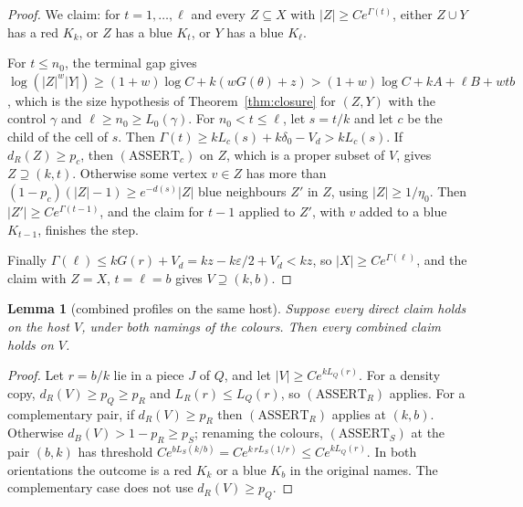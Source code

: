 \documentclass[11pt]{article}
\newtheorem{lemma}[theorem]{Lemma}
\theoremstyle{definition}
\theoremstyle{remark}
\begin{document}
\begin{proof}
We claim: for $t=1,\dots,\ell$ and every $Z\subseteq X$ with $|Z|\ge Ce^{\Gamma(t)}$, either $Z\cup Y$ has a red
$K_k$, or $Z$ has a blue $K_t$, or $Y$ has a blue $K_\ell$.

For $t\le n_0$, the terminal gap gives
$\log(|Z|^w|Y|)\ge(1+w)\log C+k(wG(\theta)+z)>(1+w)\log C+kA+\ell B+wtb$, which is the size hypothesis of
Theorem~\ref{thm:closure} for $(Z,Y)$ with the control $\gamma$ and $\ell\ge n_0\ge L_0(\gamma)$. For $n_0<t\le\ell$, let
$s=t/k$ and let $c$ be the child of the cell of $s$. Then $\Gamma(t)\ge kL_c(s)+k\delta_0-V_d>kL_c(s)$. If
$d_R(Z)\ge p_c$, then $(\mathrm{ASSERT}_c)$ on $Z$, which is a proper subset of $V$, gives $Z\supseteq(k,t)$. Otherwise
some vertex $v\in Z$ has more than $(1-p_c)(|Z|-1)\ge e^{-d(s)}|Z|$ blue neighbours $Z'$ in $Z$, using $|Z|\ge1/\eta_0$.
Then $|Z'|\ge Ce^{\Gamma(t-1)}$, and the claim for $t-1$ applied to $Z'$, with $v$ added to a blue $K_{t-1}$, finishes
the step.

Finally $\Gamma(\ell)\le kG(r)+V_d=kz-k\varepsilon/2+V_d<kz$, so $|X|\ge Ce^{\Gamma(\ell)}$, and the claim with $Z=X$,
$t=\ell=b$ gives $V\supseteq(k,b)$.
\end{proof}

\begin{lemma}[combined profiles on the same host]\label{lem:closed}
Suppose every direct claim holds on the host $V$, under both namings of the colours. Then every combined claim holds on $V$.
\end{lemma}

\begin{proof}
Let $r=b/k$ lie in a piece $J$ of $Q$, and let $|V|\ge Ce^{kL_Q(r)}$. For a density copy, $d_R(V)\ge p_Q\ge p_R$ and
$L_R(r)\le L_Q(r)$, so $(\mathrm{ASSERT}_R)$ applies. For a complementary pair, if $d_R(V)\ge p_R$ then
$(\mathrm{ASSERT}_R)$ applies at $(k,b)$. Otherwise $d_B(V)>1-p_R\ge p_S$; renaming the colours, $(\mathrm{ASSERT}_S)$ at
the pair $(b,k)$ has threshold $Ce^{bL_S(k/b)}=Ce^{k\,rL_S(1/r)}\le Ce^{kL_Q(r)}$. In both orientations the outcome is a
red $K_k$ or a blue $K_b$ in the original names. The complementary case does not use $d_R(V)\ge p_Q$.
\end{proof}
\end{document}
